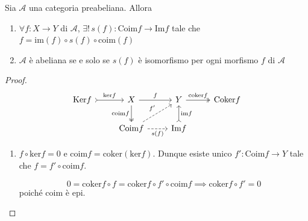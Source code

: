 \begin{theorem}{}
    Sia \(\mathcal{A}\) una categoria preabeliana. Allora
\begin{enumerate}[label = \arabic*.]
    \item \(\forall f : X \to Y\) di \(\mathcal{A}\), \(\exists !\, s{(f)} : \mathrm{Coim}f \to \mathrm{Im}f\) tale che \(f = \mathrm{im}(f) \circ s{(f)} \circ \mathrm{coim}{(f)}\) 
    \item \(\mathcal{A}\) è abeliana se e solo se \(s{(f)}\) è isomorfismo per
        ogni morfismo \(f\) di \(\mathcal{A}\) 
\end{enumerate}
\end{theorem}
\begin{proof}{}
    \[\begin{tikzcd}
	\mathrm{Ker}f & X & Y & \mathrm{Coker}f \\
	& \mathrm{Coim}f & {\mathrm{Im}f}
	\arrow["\mathrm{ker}f", tail, from=1-1, to=1-2]
	\arrow["f", from=1-2, to=1-3]
	\arrow["{\mathrm{coim}f}"', two heads, from=1-2, to=2-2]
	\arrow["\mathrm{coker}f", two heads, from=1-3, to=1-4]
	\arrow["{f'}", dashed, from=2-2, to=1-3]
	\arrow["{s(f)}"', dashed, from=2-2, to=2-3]
	\arrow["{\mathrm{im}f}"', tail, from=2-3, to=1-3]
    \end{tikzcd}\]

\begin{enumerate}[label = \arabic*.]
    \item \(f \circ \mathrm{ker}f = 0\) e \(\mathrm{coim}f = \mathrm{coker}{(\mathrm{ker}f)}\). Dunque 
        esiste unico \(f' : \mathrm{Coim}f \to Y\) tale che \(f = f' \circ \mathrm{coim}f\).

        \[
          0 = \mathrm{coker}f \circ f = \mathrm{coker}f \circ f' \circ
            \mathrm{coim}f \implies \mathrm{coker}f \circ f' = 0
        \]
        poiché \(\mathrm{coim}\) è epi.


\end{enumerate}
\end{proof}
